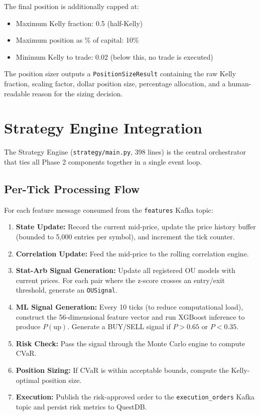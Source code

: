 \documentclass[letterpaper,11pt]{report}
\begin{document}
The final position is additionally capped at:
\begin{itemize}
    \item Maximum Kelly fraction: 0.5 (half-Kelly)
    \item Maximum position as \% of capital: 10\%
    \item Minimum Kelly to trade: 0.02 (below this, no trade is executed)
\end{itemize}

The position sizer outputs a \texttt{PositionSizeResult} containing the raw Kelly fraction, scaling factor, dollar position size, percentage allocation, and a human-readable reason for the sizing decision.


\chapter{Strategy Engine Integration}

The Strategy Engine (\texttt{strategy/main.py}, 398 lines) is the central orchestrator that ties all Phase 2 components together in a single event loop.

\section{Per-Tick Processing Flow}

For each feature message consumed from the \texttt{features} Kafka topic:

\begin{enumerate}
    \item \textbf{State Update:} Record the current mid-price, update the price history buffer (bounded to 5,000 entries per symbol), and increment the tick counter.
    \item \textbf{Correlation Update:} Feed the mid-price to the rolling correlation engine.
    \item \textbf{Stat-Arb Signal Generation:} Update all registered OU models with current prices. For each pair where the z-score crosses an entry/exit threshold, generate an \texttt{OUSignal}.
    \item \textbf{ML Signal Generation:} Every 10 ticks (to reduce computational load), construct the 56-dimensional feature vector and run XGBoost inference to produce $P(\text{up})$. Generate a BUY/SELL signal if $P > 0.65$ or $P < 0.35$.
    \item \textbf{Risk Check:} Pass the signal through the Monte Carlo engine to compute CVaR.
    \item \textbf{Position Sizing:} If CVaR is within acceptable bounds, compute the Kelly-optimal position size.
    \item \textbf{Execution:} Publish the risk-approved order to the \texttt{execution\_orders} Kafka topic and persist risk metrics to QuestDB.
\end{enumerate}
\end{document}
